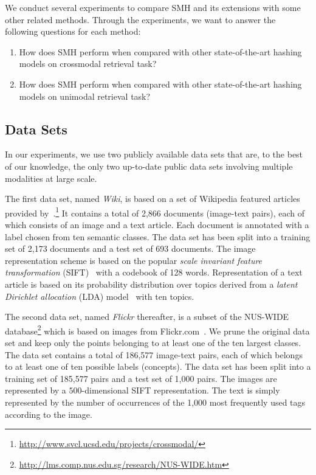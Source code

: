We conduct several experiments to compare \mbox{SMH} and its extensions with some other related methods. Through the experiments, we want to answer the following questions for each method:

\begin{enumerate}
\item How does \mbox{SMH} perform when compared with other state-of-the-art hashing models on crossmodal retrieval task?
\item How does \mbox{SMH} perform when compared with other state-of-the-art hashing models on unimodal retrieval task?
\end{enumerate}

\subsection{Data Sets}
\label{smh:exps:data}

In our experiments, we use two publicly available data sets that are, to the best of our knowledge, the only two up-to-date public data sets involving multiple modalities at large scale.

The first data set, named \textit{Wiki}, is based on a set of Wikipedia featured articles provided by~\cite{rasiwasia2010mm}.\footnote{\url{http://www.svcl.ucsd.edu/projects/crossmodal/}} It contains a total of 2,866 documents (image-text pairs), each of which consists of an image and a text article. Each document is annotated with a label chosen from ten semantic classes. The data set has been split into a training set of 2,173 documents and a test set of 693 documents. The image representation scheme is based on the popular \textit{scale invariant feature transformation} (\mbox{SIFT})~\cite{lowe2004ijcv} with a codebook of 128 words.  Representation of a text article is based on its probability distribution over topics derived from a \textit{latent Dirichlet allocation} (\mbox{LDA}) model~\cite{blei2003jmlr} with ten topics.

The second data set, named \textit{\mbox{Flickr}} thereafter, is a subset of the NUS-WIDE database\footnote{\url{http://lms.comp.nus.edu.sg/research/NUS-WIDE.htm}} which is based on images from \mbox{Flickr.com}~\cite{nus-wide-civr09}. We prune the original data set and keep only the points belonging to at least one of the ten largest classes. The data set contains a total of 186,577 image-text pairs, each of which belongs to at least one of ten possible labels (\aka concepts). The data set has been split into a training set of 185,577 pairs and a test set of 1,000 pairs. The images are represented by a $500$-dimensional \mbox{SIFT} representation. The text is simply represented by the number of occurrences of the 1,000 most frequently used tags according to the image.

